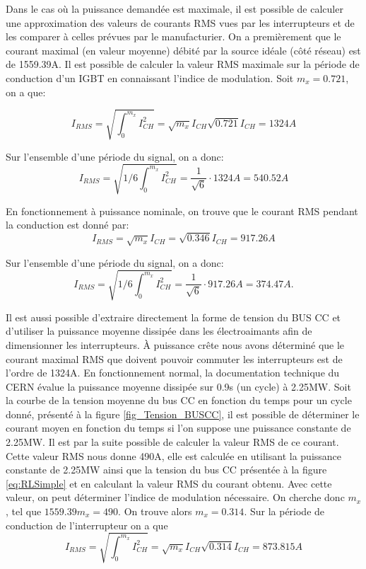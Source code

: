 Dans le cas où la puissance demandée est maximale, il est possible de calculer une approximation des valeurs de courants RMS vues par les interrupteurs et de les comparer à celles prévues par le manufacturier. On a premièrement que le courant maximal (en valeur moyenne) débité par la source idéale (côté réseau) est de 1559.39A. Il est possible de calculer la valeur RMS maximale sur la période de conduction d'un IGBT en connaissant l'indice de modulation. Soit $m_x = 0.721$, on a que:

\begin{equation}
I_{RMS} = \sqrt{\int_0^{m_x} I_{CH}^2} = \sqrt{m_x}I_{CH}  \sqrt{0.721}I_{CH}= 1324A
\end{equation}

Sur l'ensemble d'une période du signal, on a donc:
\begin{equation}
I_{RMS} =  \sqrt{1/6\int_0^{m_x} I_{CH}^2} = \frac{1}{\sqrt{6}}\cdot 1324A = 540.52A
\end{equation}

En fonctionnement à puissance nominale, on trouve que le courant RMS pendant la conduction est donné par:
\begin{equation}
I_{RMS} =  \sqrt{m_x}I_{CH} = \sqrt{0.346}I_{CH} = 917.26A
\end{equation}

Sur l'ensemble d'une période du signal, on a donc:
\begin{equation}
I_{RMS} =  \sqrt{1/6\int_0^{m_x} I_{CH}^2} = \frac{1}{\sqrt{6}}\cdot 917.26A = 374.47A.
\end{equation}

Il est aussi possible d'extraire directement la forme de tension du BUS CC et d'utiliser la puissance moyenne dissipée dans les électroaimants afin de dimensionner les interrupteurs. À puissance crête nous avons déterminé que le courant maximal RMS que doivent pouvoir commuter les interrupteurs est de l'ordre de 1324A. En fonctionnement normal, la documentation technique du CERN évalue la puissance moyenne dissipée sur 0.9s (un cycle) à 2.25MW. Soit la courbe de la tension moyenne du bus CC en fonction du temps pour un cycle donné, présenté à la figure \ref{fig_Tension_BUSCC}, il est possible de déterminer le courant moyen en fonction du temps si l'on suppose une puissance constante de 2.25MW. Il est par la suite possible de calculer la valeur RMS de ce courant. Cette valeur RMS nous donne 490A, elle est calculée en utilisant la puissance constante de 2.25MW ainsi que la tension du bus CC présentée à la figure \ref{eq:RLSimple} et en calculant la valeur RMS du courant obtenu. Avec cette valeur, on peut déterminer l'indice de modulation nécessaire. On cherche donc $m_x$, tel que $1559.39m_x = 490$. On trouve alors $m_x = 0.314$. Sur la période de conduction de l'interrupteur on a que
\begin{equation}
I_{RMS} = \sqrt{\int_0^{m_x} I_{CH}^2} = \sqrt{m_x}I_{CH}  \sqrt{0.314}I_{CH}= 873.815A
\end{equation}

